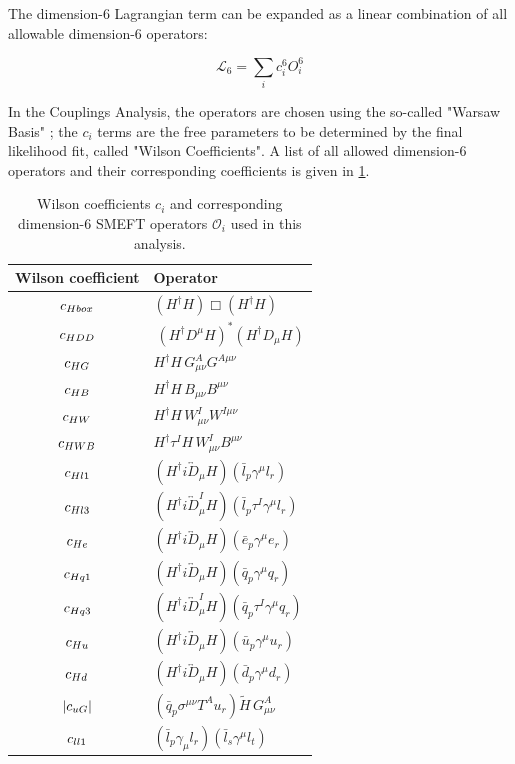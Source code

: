 The dimension-6 Lagrangian term can be expanded as a linear combination of all allowable dimension-6 operators:

\begin{equation}
\mathcal{L}_{6} = \sum_{i} c_{i}^6 O_{i}^{6}
\end{equation}

In the Couplings Analysis, the operators are chosen using the so-called "Warsaw Basis" \cite{Warsaw}; the $c_{i}$ terms are the free parameters to be determined by the final likelihood fit, called "Wilson Coefficients". A list of all allowed dimension-6 operators and their corresponding coefficients is given in \ref{tab:EFT}.

\begin{table}
  \centering
  \begin{tabular}{c l}
  \hline
  Wilson coefficient & Operator \\
  \hline
  $c_{Hbox}$ & $(H^\dag H)\Box(H^\dag H)$\\
  $c_{HDD}$   & $\ \left(H^\dag D^\mu H\right)^* \left(H^\dag D_\mu H\right)$\\
  $c_{HG}$  & $H^\dag H\, G^A_{\mu\nu} G^{A\mu\nu}$  \\
  $c_{HB}$ &  $ H^\dag H\, B_{\mu\nu} B^{\mu\nu}$\\
  $c_{HW}$ &  $H^\dag H\, W^I_{\mu\nu} W^{I\mu\nu}$\\
  $c_{HWB}$ &  $ H^\dag \tau^I H\, W^I_{\mu\nu} B^{\mu\nu}$\\
  $c_{Hl1}$ & $(H^\dag i\overleftrightarrow{D}_\mu H)(\bar l_p \gamma^\mu l_r)$\\
  $c_{Hl3}$ & $(H^\dag i\overleftrightarrow{D}^I_\mu H)(\bar l_p \tau^I \gamma^\mu l_r)$\\
  $c_{He}$  & $(H^\dag i\overleftrightarrow{D}_\mu H)(\bar e_p \gamma^\mu e_r)$\\
  $c_{Hq1}$ & $(H^\dag i\overleftrightarrow{D}_\mu H)(\bar q_p \gamma^\mu q_r)$\\
  $c_{Hq3}$ & $(H^\dag i\overleftrightarrow{D}^I_\mu H)(\bar q_p \tau^I \gamma^\mu q_r)$\\
  $c_{Hu}$  & $(H^\dag i\overleftrightarrow{D}_\mu H)(\bar u_p \gamma^\mu u_r)$\\
  $c_{Hd}$  & $(H^\dag i\overleftrightarrow{D}_\mu H)(\bar d_p \gamma^\mu d_r)$\\
  $|c_{uG}|$ & $(\bar q_p \sigma^{\mu\nu} T^A u_r) \widetilde H \, G_{\mu\nu}^A$ \\
  $c_{ll1}$   & $(\bar l_p \gamma_\mu l_r)(\bar l_s \gamma^\mu l_t)$ \\
  \hline
\end{tabular}
  \caption{Wilson coefficients $c_i$ and corresponding dimension-6 SMEFT operators $\mathcal{O}_i$ used in this analysis.}
  \label{tab:EFT}
\end{table}

